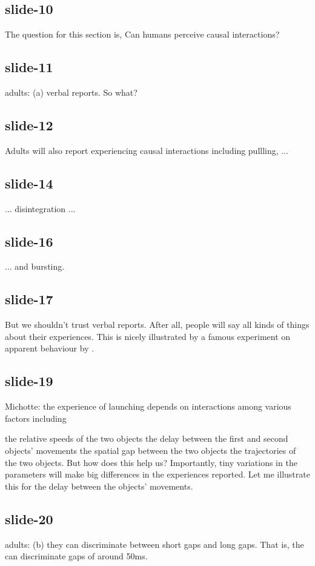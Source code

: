 \documentclass[12pt,\papersize]{extarticle}
\begin{document}
 
\subsection{slide-10}
The question for this section is,
Can humans perceive causal interactions?
 
 
\subsection{slide-11}
adults: (a) verbal reports. So what?
 
 
\subsection{slide-12}
Adults will also report experiencing causal interactions including pullling, ...
 
 
\subsection{slide-14}
... disintegration ...
 
 
\subsection{slide-16}
... and bursting.
 
 
\subsection{slide-17}
But we shouldn't trust verbal reports. After all, people will say all kinds of things about their experiences. This is nicely illustrated by a famous experiment on apparent behaviour by \citet{Heider:1944ts}.
 
 
\subsection{slide-19}
Michotte: the experience of launching depends on interactions among various factors including

the relative speeds of the two objects
the delay between the first and second objects’ movements
the spatial gap between the two objects
the trajectories of the two objects.
But how does this help us? Importantly, tiny variations in the parameters will make big differences in the experiences reported. Let me illustrate this for the delay between the objects' movements.
 
 
\subsection{slide-20}
adults: (b) they can discriminate between short gaps and long gaps.
That is, the can discriminate gaps of around 50ms.
 
\end{document}
